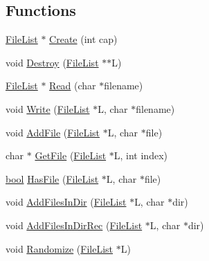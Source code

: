 \subsection*{Functions}
\begin{DoxyCompactItemize}
\item 
\hyperlink{namespacegft_1_1FileList_a3a0ba3f59376d46215f21160690c6be1}{File\-List} $\ast$ \hyperlink{namespacegft_1_1FileList_a96a5b9ca248328eec3a5ca774f0e1980}{Create} (int cap)
\item 
void \hyperlink{namespacegft_1_1FileList_a380a0473adbc1addcfd0f54d2932d561}{Destroy} (\hyperlink{namespacegft_1_1FileList_a3a0ba3f59376d46215f21160690c6be1}{File\-List} $\ast$$\ast$L)
\item 
\hyperlink{namespacegft_1_1FileList_a3a0ba3f59376d46215f21160690c6be1}{File\-List} $\ast$ \hyperlink{namespacegft_1_1FileList_ad3fb00641cbcccbbcae02d84e07a43c9}{Read} (char $\ast$filename)
\item 
void \hyperlink{namespacegft_1_1FileList_af26aca840cfe694c9f2564bf803f59f8}{Write} (\hyperlink{namespacegft_1_1FileList_a3a0ba3f59376d46215f21160690c6be1}{File\-List} $\ast$L, char $\ast$filename)
\item 
void \hyperlink{namespacegft_1_1FileList_a5a09d41277e3ee79c98b4e5203e20e53}{Add\-File} (\hyperlink{namespacegft_1_1FileList_a3a0ba3f59376d46215f21160690c6be1}{File\-List} $\ast$L, char $\ast$file)
\item 
char $\ast$ \hyperlink{namespacegft_1_1FileList_a5cc9caa68851ec9e9b013fe1907b5a06}{Get\-File} (\hyperlink{namespacegft_1_1FileList_a3a0ba3f59376d46215f21160690c6be1}{File\-List} $\ast$L, int index)
\item 
\hyperlink{namespacegft_a033dba4822661600b08d2bbf16879252}{bool} \hyperlink{namespacegft_1_1FileList_a2f965975f5251f61dc0e46cea6cfc3ea}{Has\-File} (\hyperlink{namespacegft_1_1FileList_a3a0ba3f59376d46215f21160690c6be1}{File\-List} $\ast$L, char $\ast$file)
\item 
void \hyperlink{namespacegft_1_1FileList_a4475f92f0e27150c45eca1a796c4da2a}{Add\-Files\-In\-Dir} (\hyperlink{namespacegft_1_1FileList_a3a0ba3f59376d46215f21160690c6be1}{File\-List} $\ast$L, char $\ast$dir)
\item 
void \hyperlink{namespacegft_1_1FileList_a52713df34120773914947725af457612}{Add\-Files\-In\-Dir\-Rec} (\hyperlink{namespacegft_1_1FileList_a3a0ba3f59376d46215f21160690c6be1}{File\-List} $\ast$L, char $\ast$dir)
\item 
void \hyperlink{namespacegft_1_1FileList_ae282488ea9506e097b3bace7fe8f08e6}{Randomize} (\hyperlink{namespacegft_1_1FileList_a3a0ba3f59376d46215f21160690c6be1}{File\-List} $\ast$L)
$$
\end{DoxyCompactItemize}
